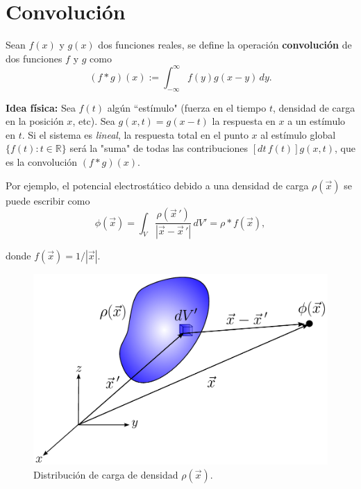 \section{Convolución}

\begin{defi}
Sean $f(x)$ y $g(x)$ dos funciones reales, se define la operación \textbf{convolución} de dos funciones $f$ y $g$ como 
\begin{equation}
 (f*g)(x) := \int_{-\infty}^{\infty} f(y) g(x-y) \,dy.   \label{Convolucion}
\end{equation}

\end{defi}

\textbf{Idea física:} Sea $f(t)$ algún ``estímulo" (fuerza en el tiempo $t$, densidad de carga en la posición $x$, etc). Sea $g(x,t) = g(x-t)$ la respuesta en $x$ a un estímulo en $t$. Si el sistema es \textit{lineal}, la respuesta total en el punto $x$ al estímulo global $\{f(t) : t \in \mathbb{R}\}$ será la "suma" de todas las contribuciones $[dt\, f(t)] g(x,t)$, que es la convolución $(f*g)(x)$. 

Por ejemplo, el potencial electrostático debido a una densidad de carga $\rho(\Vec{x})$ se puede escribir como
$$\phi(\Vec{x}) = \int_{V} \frac{\rho(\Vec{x}\,')}{|\Vec{x} - \Vec{x}\,'|} \, dV' = \rho * f(\Vec{x}),$$

donde  $f(\Vec{x}) = 1/|\Vec{x}|$.

\begin{figure}[H]
    \centering
    \includegraphics[scale = 0.55]{Figuras/Distribucion-Cargas.pdf}
    \caption{Distribución de carga de densidad $\rho(\Vec{x})$.}
    \label{fig:PotencialDistribucion}
\end{figure}

